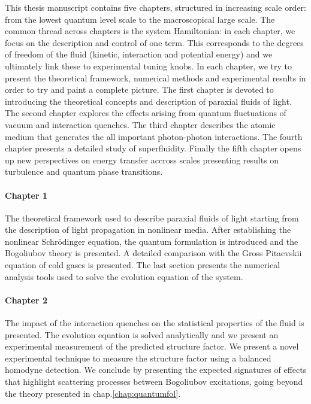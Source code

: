 This thesis manuscript contains five chapters, structured in increasing scale order: from the lowest quantum level scale 
to the macroscopical large scale.
The common thread across chapters is the system Hamiltonian: 
in each chapter, we focus on the description and control of one term.
This corresponds to the degrees of freedom of the fluid (kinetic, interaction and potential energy) and we ultimately
link these to experimental tuning knobs.
In each chapter, we try to present the theoretical framework, numerical methods and experimental results in 
order to try and paint a complete picture.
The first chapter is devoted to introducing the theoretical concepts and description of paraxial fluids of light.
The second chapter explores the effects arising from quantum fluctuations of vacuum and interaction quenches.
The third chapter describes the atomic medium that generates the all important photon-photon interactions.
The fourth chapter presents a detailed study of superfluidity. 
Finally the fifth chapter opens up new perspectives on energy transfer accross scales presenting results on 
turbulence and quantum phase transitions.

\paragraph*{Chapter 1}

The theoretical framework used to describe paraxial fluids of light starting from the description of light
propagation in nonlinear media.
After establishing the nonlinear Schrödinger equation, the quantum formulation is introduced and the 
Bogoliubov theory is presented.
A detailed comparison with the Gross Pitaevskii equation of cold gases is presented.
The last section presents the numerical analysis tools used to solve the evolution equation of the system.

\paragraph*{Chapter 2}

The impact of the interaction quenches on the statistical properties of the fluid is presented.
The evolution equation is solved analytically and we present an experimental measurement of the 
predicted structure factor.
We present a novel experimental technique to measure the structure factor using a balanced homodyne 
detection. 
We conclude by presenting the expected signatures of effects that highlight scattering processes 
between Bogoliubov excitations, going beyond the theory presented in chap.\ref{chap:quantumfol}.

